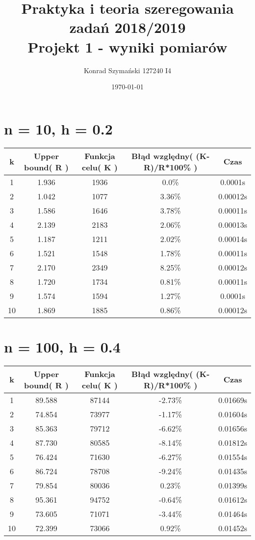\documentclass[12pt,a4paper]{article}
\title{Praktyka i teoria szeregowania zadań 2018/2019\\ Projekt 1 - wyniki pomiarów}
\author{Konrad Szymański 127240 I4}
\date{\vfill \today}
\begin{document}
\maketitle
\newpage

\section{n = 10, h = 0.2}
\begin{table}[!h]
 \begin{tabular}{|c|c|c|c|c|} 
	\hline
	 k&Upper bound( R )&Funkcja celu( K )&Błąd względny( (K-R)/R*100\% )&Czas\\ \hline
	1&1.936&1936&0.0\%&0.0001s\\ \hline
	2&1.042&1077&3.36\%&0.00012s\\ \hline
	3&1.586&1646&3.78\%&0.00011s\\ \hline
	4&2.139&2183&2.06\%&0.00013s\\ \hline
	5&1.187&1211&2.02\%&0.00014s\\ \hline
	6&1.521&1548&1.78\%&0.00011s\\ \hline
	7&2.170&2349&8.25\%&0.00012s\\ \hline
	8&1.720&1734&0.81\%&0.00011s\\ \hline
	9&1.574&1594&1.27\%&0.0001s\\ \hline
	10&1.869&1885&0.86\%&0.00012s\\ \hline
 \end{tabular}
 	\centering
\end{table}

\section{n = 100, h = 0.4}
\begin{table}[!h]
 \begin{tabular}{|c|c|c|c|c|} 
	\hline
	 k&Upper bound( R )&Funkcja celu( K )&Błąd względny( (K-R)/R*100\% )&Czas\\ \hline
	1&89.588&87144&-2.73\%&0.01669s\\ \hline
	2&74.854&73977&-1.17\%&0.01604s\\ \hline
	3&85.363&79712&-6.62\%&0.01656s\\ \hline
	4&87.730&80585&-8.14\%&0.01812s\\ \hline
	5&76.424&71630&-6.27\%&0.01554s\\ \hline
	6&86.724&78708&-9.24\%&0.01435s\\ \hline
	7&79.854&80036&0.23\%&0.01399s\\ \hline
	8&95.361&94752&-0.64\%&0.01612s\\ \hline
	9&73.605&71071&-3.44\%&0.01464s\\ \hline
	10&72.399&73066&0.92\%&0.01452s\\ \hline
 \end{tabular}
 	\centering
\end{table}
\end{document}
